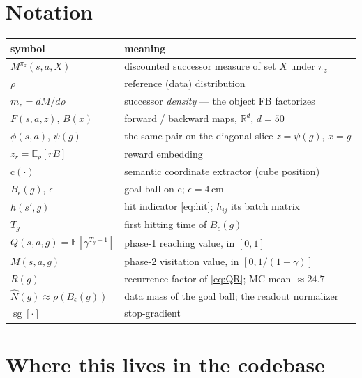 \documentclass[11pt]{article}
\newcommand{\E}{\mathbb{E}}
\newcommand{\sg}{\operatorname{sg}}
\newcommand{\ball}[1]{B_\epsilon(#1)}
\newcommand{\cube}{\mathrm{c}}
\begin{document}
\appendix
\section{Notation}

\begin{center}
\begin{tabular}{ll}
\toprule
symbol & meaning \\
\midrule
$M^{\pi_z}(s,a,X)$ & discounted successor measure of set $X$ under $\pi_z$ \\
$\rho$ & reference (data) distribution \\
$m_z = dM/d\rho$ & successor \emph{density} --- the object FB factorizes \\
$F(s,a,z)$, $B(x)$ & forward / backward maps, $\mathbb{R}^d$, $d=50$ \\
$\phi(s,a)$, $\psi(g)$ & the same pair on the diagonal slice $z=\psi(g),\,x=g$ \\
$z_r=\E_{\rho}[r B]$ & reward embedding \\
$\cube(\cdot)$ & semantic coordinate extractor (cube position) \\
$\ball{g}$, $\epsilon$ & goal ball on $\cube$; $\epsilon = 4$\,cm \\
$h(s',g)$ & hit indicator \eqref{eq:hit}; $h_{ij}$ its batch matrix \\
$T_g$ & first hitting time of $\ball{g}$ \\
$Q(s,a,g)=\E[\gamma^{T_g-1}]$ & phase-1 reaching value, in $[0,1]$ \\
$M(s,a,g)$ & phase-2 visitation value, in $[0,1/(1-\gamma)]$ \\
$R(g)$ & recurrence factor of \eqref{eq:QR}; MC mean $\approx24.7$ \\
$\hat N(g)\approx\rho(\ball{g})$ & data mass of the goal ball; the readout normalizer \\
$\sg[\cdot]$ & stop-gradient \\
\bottomrule
\end{tabular}
\end{center}

\section{Where this lives in the codebase}
\end{document}
